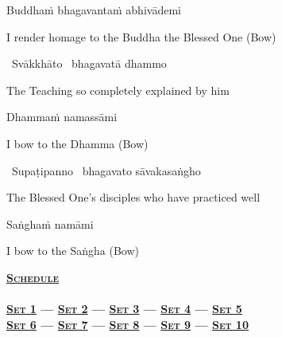 Buddhaṁ bhagavantaṁ abhivādemi

\begin{english}
  I render homage to the Buddha the Blessed One \hfill{(Bow)}
\end{english}

\anglebracketleft\ \hspace{-0.5mm}Svākkhāto \hspace{-0.5mm}\anglebracketright\ bhagavatā dhammo

\begin{english}
  The Teaching so completely explained by him
\end{english}

Dhammaṁ namassāmi

\begin{english}
  I bow to the Dhamma \hfill{(Bow)}
\end{english}

\anglebracketleft\ \hspace{-0.5mm}Supaṭipanno \hspace{-0.5mm}\anglebracketright\ bhagavato sāvakasaṅgho

\begin{english}
  The Blessed One's disciples who have practiced well
\end{english}

Saṅghaṁ namāmi

\begin{english}
  I bow to the Saṅgha \hfill{(Bow)}\\
\end{english}

\null
\vfill

\begin{minipage}[b][25pt][c]{\linewidth}
  \begin{leader}
    \textbf{\vspace{0.2em}\textsc{\hyperref[schedule]{Schedule}\\
        {\centering{}}\\
        \vspace{0.8em}
        \hyperref[buddhas-first-exclamation]{Set 1} \hspace{0.02cm} — \hspace{0.02cm} \hyperref[characteristic-of-not-self]{Set 2} \hspace{0.02cm} — \hspace{0.02cm} \hyperref[noble-eightfold-path]{Set 3} \hspace{0.02cm} — \hspace{0.02cm} \hyperref[dedication-of-offerings]{Set 4} \hspace{0.02cm} — \hspace{0.02cm} \hyperref[mindfulness-of-breathing]{Set 5}\\
        \vspace{0.5em}
        \hyperref[anatta-lakkhana]{Set 6} — \hyperref[dependent-origination]{Set 7} — \hyperref[aditta-pariyaya]{Set 8} — \hyperref[deva-aradhana]{Set 9} — \hyperref[pubba-bhaga-nama-kara-patho]{Set 10}}}
  \end{leader}
\end{minipage}
